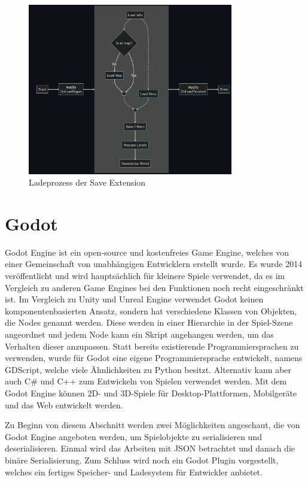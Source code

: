\begin{figure}[htp]
    \centering
    \includegraphics[width=0.8\textwidth]{images/piperift_load_process.png}
    \caption{Ladeprozess der Save Extension\cite{piperiftLoadProcess}}
    \label{fig:piperiftLoadProcess}
\end{figure}


\section{Godot}
Godot Engine ist ein open-source und kostenfreies Game Engine, welches von einer Gemeinschaft von unabhängigen Entwicklern erstellt wurde. Es wurde 2014 veröffentlicht und wird hauptsächlich für kleinere Spiele verwendet, da es im Vergleich zu anderen Game Engines bei den Funktionen noch recht eingeschränkt ist. Im Vergleich zu Unity und Unreal Engine verwendet Godot keinen komponentenbasierten Ansatz, sondern hat verschiedene Klassen von Objekten, die Nodes genannt werden. Diese werden in einer Hierarchie in der Spiel-Szene angeordnet und jedem Node kann ein Skript angehangen werden, um das Verhalten dieser anzupassen. Statt bereits existierende Programmiersprachen zu verwenden, wurde für Godot eine eigene Programmiersprache entwickelt, namens GDScript, welche viele Ähnlichkeiten zu Python besitzt. Alternativ kann aber auch C\# und C++ zum Entwickeln von Spielen verwendet werden. Mit dem Godot Engine können 2D- und 3D-Spiele für Desktop-Plattformen, Mobilgeräte und das Web entwickelt werden.\cite{salmela2022game}

Zu Beginn von diesem Abschnitt werden zwei Möglichkeiten angeschaut, die von Godot Engine angeboten werden, um Spielobjekte zu serialisieren und deserialisieren. Einmal wird das Arbeiten mit JSON betrachtet und danach die binäre Serialisierung. Zum Schluss wird noch ein Godot Plugin vorgestellt, welches ein fertiges Speicher- und Ladesystem für Entwickler anbietet. 

